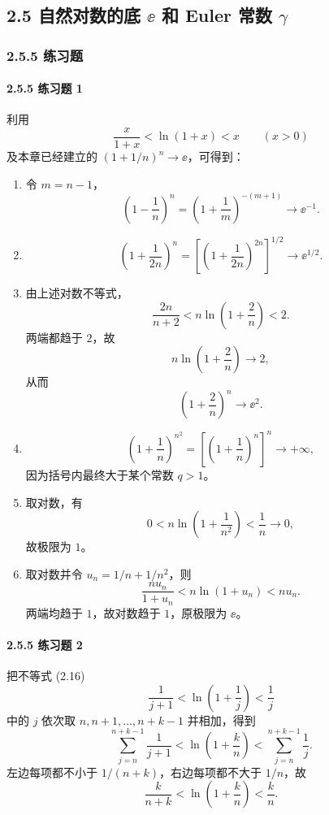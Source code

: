 \subsection*{2.5 自然对数的底 $\ee$ 和 Euler 常数 $\gamma$}

\subsubsection*{2.5.5 练习题}

\paragraph{2.5.5 练习题 1}
\begin{xsolution}
利用
\[
  \frac{x}{1+x}<\ln(1+x)<x\qquad(x>0)
\]
及本章已经建立的 $\left(1+1/n\right)^n\to\ee$，可得到：
\begin{enumerate}[label=(\arabic*)]
  \item 令 $m=n-1$，
  \[
    \left(1-\frac1n\right)^n
    =\left(1+\frac1m\right)^{-(m+1)}\to\ee^{-1}.
  \]
  \item
  \[
    \left(1+\frac1{2n}\right)^n
    =\left[\left(1+\frac1{2n}\right)^{2n}\right]^{1/2}\to\ee^{1/2}.
  \]
  \item 由上述对数不等式，
  \[
    \frac{2n}{n+2}
    <n\ln\left(1+\frac2n\right)<2.
  \]
  两端都趋于 $2$，故
  \[
    n\ln\left(1+\frac2n\right)\to2,
  \]
  从而
  \[
    \left(1+\frac2n\right)^n\to\ee^2.
  \]
  \item
  \[
    \left(1+\frac1n\right)^{n^2}
    =\left[\left(1+\frac1n\right)^n\right]^n\to+\infty,
  \]
  因为括号内最终大于某个常数 $q>1$。
  \item 取对数，有
  \[
    0<n\ln\left(1+\frac1{n^2}\right)<\frac1n\to0,
  \]
  故极限为 $1$。
  \item 取对数并令 $u_n=1/n+1/n^2$，则
  \[
    \frac{nu_n}{1+u_n}<n\ln(1+u_n)<nu_n.
  \]
  两端均趋于 $1$，故对数趋于 $1$，原极限为 $\ee$。
\end{enumerate}
\end{xsolution}

\paragraph{2.5.5 练习题 2}
\begin{xsolution}
把不等式 (2.16)
\[
  \frac1{j+1}<\ln\left(1+\frac1j\right)<\frac1j
\]
中的 $j$ 依次取 $n,n+1,\ldots,n+k-1$ 并相加，得到
\[
  \sum_{j=n}^{n+k-1}\frac1{j+1}
  <\ln\left(1+\frac kn\right)
  <\sum_{j=n}^{n+k-1}\frac1j.
\]
左边每项都不小于 $1/(n+k)$，右边每项都不大于 $1/n$，故
\[
  \boxed{\frac{k}{n+k}<\ln\left(1+\frac kn\right)<\frac kn}.
\]
\end{xsolution}

